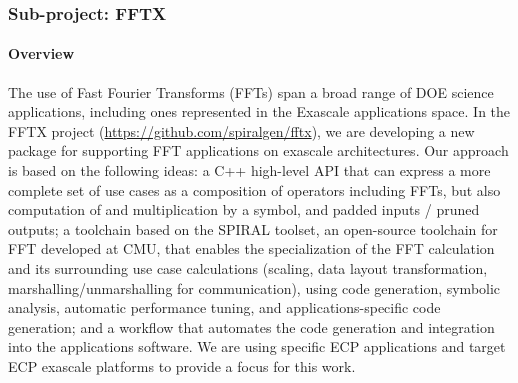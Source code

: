 
\subsubsection{ Sub-project: FFTX} \label{subsubsect:fftx}
\noindent

\paragraph{Overview}

The use of Fast Fourier Transforms (FFTs) span a broad range of DOE science applications, including ones represented in the Exascale applications space.
In the FFTX project (\url{https://github.com/spiralgen/fftx}), 
we are developing a new package for supporting FFT applications on exascale architectures. Our approach is based on the following ideas: a C++ high-level API that can express a more complete set of use cases as a composition of operators including FFTs, but also computation of and multiplication by a symbol, and padded inputs / pruned outputs; a toolchain based on the SPIRAL toolset, an open-source toolchain for FFT developed at CMU, that enables the
specialization of the FFT calculation and its surrounding use case calculations (scaling, data layout transformation, marshalling/unmarshalling for communication), using code generation, symbolic analysis, automatic performance tuning, and applications-specific code generation; and a workflow that automates the code generation and integration into the applications software. We are using specific ECP applications and target ECP exascale platforms to provide a focus for this work.

